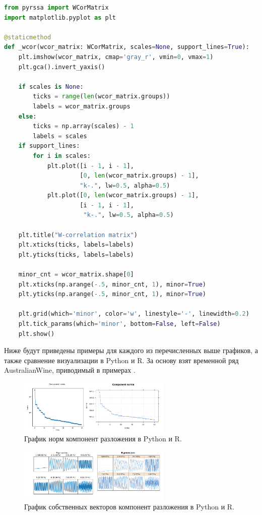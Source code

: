 \documentclass[specialist,
			   substylefile = spbu_report.rtx,
			   subf,href,colorlinks=true, 12pt]{disser}
\begin{document}
\begin{lstlisting}[language=Python, caption=Визуализация взвешенных корреляций с помощью matplotlib.]
from pyrssa import WCorMatrix	
import matplotlib.pyplot as plt
	
@staticmethod
def _wcor(wcor_matrix: WCorMatrix, scales=None, support_lines=True):
    plt.imshow(wcor_matrix, cmap='gray_r', vmin=0, vmax=1)
    plt.gca().invert_yaxis()

    if scales is None:
        ticks = range(len(wcor_matrix.groups))
        labels = wcor_matrix.groups
    else:
        ticks = np.array(scales) - 1
        labels = scales
    if support_lines:
        for i in scales:
            plt.plot([i - 1, i - 1], 
                     [0, len(wcor_matrix.groups) - 1],
                     "k-.", lw=0.5, alpha=0.5)
            plt.plot([0, len(wcor_matrix.groups) - 1], 
                     [i - 1, i - 1],
                      "k-.", lw=0.5, alpha=0.5)
                      
    plt.title("W-correlation matrix")
    plt.xticks(ticks, labels=labels)
    plt.yticks(ticks, labels=labels)
    
    minor_cnt = wcor_matrix.shape[0]
    plt.xticks(np.arange(-.5, minor_cnt, 1), minor=True)
    plt.yticks(np.arange(-.5, minor_cnt, 1), minor=True)
    
    plt.grid(which='minor', color='w', linestyle='-', linewidth=0.2)
    plt.tick_params(which='minor', bottom=False, left=False)
    plt.show()
\end{lstlisting}

Ниже будут приведены примеры для каждого из перечисленных выше графиков, а также сравнение визуализации в Python и R. За основу взят временной ряд AustralianWine, приводимый в примерах \cite{rssa-book}. 


\begin{figure}[htp]
	\centering
	\includegraphics[width=0.65\textwidth]{rpy_norms}
	\caption{График норм компонент разложения в Python и R.}
	\label{fig:rpy_norms}
\end{figure}

\begin{figure}[htp]
	\centering
	\includegraphics[width=0.65\textwidth]{rpy_vectors}
	\caption{График собственных векторов компонент разложения в Python и R.}
	\label{fig:rpy_vectors}
\end{figure}
\end{document}
